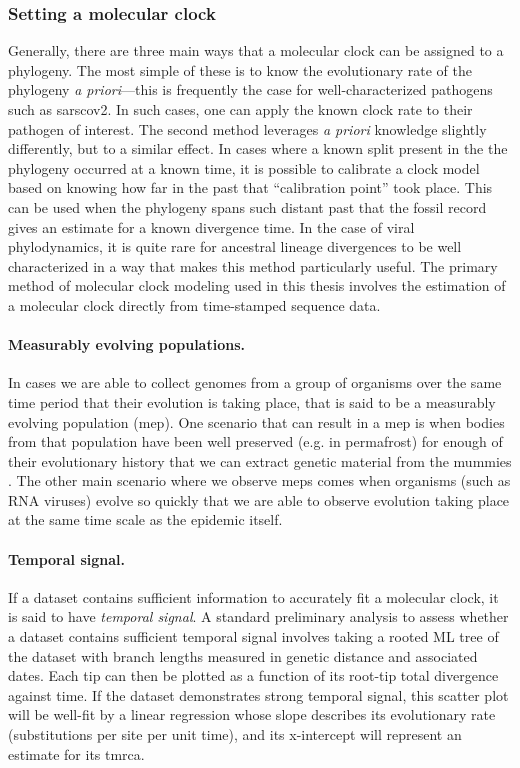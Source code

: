 \subsubsection{Setting a molecular clock}
Generally, there are three main ways that a molecular clock can be assigned to a phylogeny.
The most simple of these is to know the evolutionary rate of the phylogeny \textit{a priori}---this is frequently the case for well-characterized pathogens such as \gls{sarscov2}.
In such cases, one can apply the known clock rate to their pathogen of interest.
The second method leverages \textit{a priori} knowledge slightly differently, but to a similar effect.
In cases where a known split present in the the phylogeny occurred at a known time, it is possible to calibrate a clock model based on knowing how far in the past that ``calibration point'' took place.
This can be used when the phylogeny spans such distant past that the fossil record gives an estimate for a known divergence time.
In the case of viral phylodynamics, it is quite rare for ancestral lineage divergences to be well characterized in a way that makes this method particularly useful.
The primary method of molecular clock modeling used in this thesis involves the estimation of a molecular clock directly from time-stamped sequence data.

\paragraph*{Measurably evolving populations.}
In cases we are able to collect genomes from a group of organisms over the same time period that their evolution is taking place, that is said to be a measurably evolving population (\gls{mep}).
One scenario that can result in a \gls{mep} is when bodies from that population have been well preserved (e.g. in permafrost) for enough of their evolutionary history that we can extract genetic material from the mummies \citep{shapiro2004rise}.
The other main scenario where we observe \gls{mep}s comes when organisms (such as RNA viruses) evolve so quickly that we are able to observe evolution taking place at the same time scale as the epidemic itself.

\paragraph*{Temporal signal.}
If a dataset contains sufficient information to accurately fit a molecular clock, it is said to have \textit{temporal signal}.
A standard preliminary analysis to assess whether a dataset contains sufficient temporal signal involves taking a rooted ML tree of the dataset with branch lengths measured in genetic distance and associated dates.
Each tip can then be plotted as a function of its root-tip total divergence against time.
If the dataset demonstrates strong temporal signal, this scatter plot will be well-fit by a linear regression whose slope describes its evolutionary rate (substitutions per site per unit time), and its x-intercept will represent an estimate for its \gls{tmrca}.

